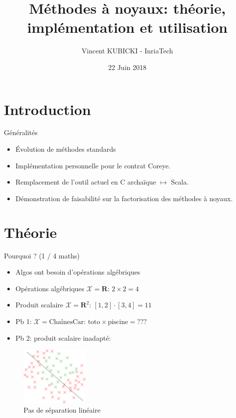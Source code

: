\documentclass{beamer}
\title[Kernalytics]{Méthodes à noyaux: théorie, implémentation et utilisation}
\author[VK]{Vincent KUBICKI - InriaTech}
\institute[Inria]{Inria Lille - Nord Europe}
\date{22 Juin 2018}
\begin{document}
\begin{frame}[plain]
	\titlepage
\end{frame}

\section{Introduction}


\begin{frame}{Généralités}
	\begin{itemize}
		\item Évolution de méthodes standards
		\item Implémentation personnelle pour le contrat Coreye.
		\item Remplacement de l'outil actuel en C archaïque $\mapsto$ Scala.
		\item Démonstration de faisabilité sur la factorisation des méthodes à noyaux.
	\end{itemize}
\end{frame}

\section{Théorie}

\begin{frame}{Pourquoi ? (1 / 4 maths)}
	\begin{itemize}
		\item Algos ont besoin d'opérations algébriques
		\item Opérations algébriques $\mathcal{X} = \mathbf{R}$: $2 \times 2 = 4$
		\item Produit scalaire $\mathcal{X} = \mathbf{R}^2$: $[1, 2] \cdot [3, 4] = 11$
		\item Pb 1: $\mathcal{X} = \text{ChaînesCar}$: $\text{toto} \times \text{piscine} = ???$
		\item Pb 2: produit scalaire inadapté:
	\end{itemize}

	\begin{figure}[b]
		\includegraphics[width=0.3\textwidth]{figures/linsep}
		\caption{Pas de séparation linéaire}
	\end{figure}
\end{frame}
\end{document}
